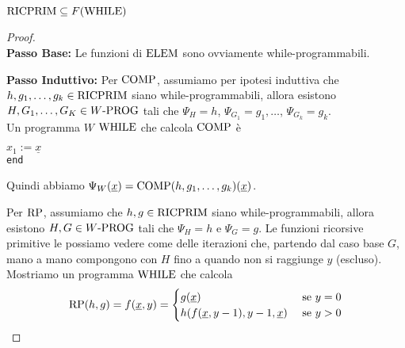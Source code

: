\begin{theor}
	$\text{RICPRIM} \subseteq F(\text{WHILE})$
\end{theor}
\begin{proof} \hspace{1cm} \\
	\textbf{Passo Base:} Le funzioni di $\text{ELEM}$ sono ovviamente while-programmabili.
	
	\textbf{Passo Induttivo:} Per $\text{COMP}$, assumiamo per ipotesi induttiva che $h,g_1, \dots, g_k \in \text{RICPRIM}$ siano while-programmabili, allora esistono $H, G_1, \dots, G_K \in W\text{-PROG}$ tali che $\Psi_H = h$, $\Psi_{G_1} = g_1, \dots$, $\Psi_{G_k} = g_k$.\\
	Un programma $W$ $\text{WHILE}$ che calcola $\text{COMP}$ è
	
	\begin{center}
		\begin{minipage}{0.85\textwidth}
			\begin{tcolorbox}[colback=white,sharp corners,boxrule=.3mm]
				\begin{algorithm}[H]
					\SetAlgoNoEnd
					$x_1 := \underline{x}$ \\
					\texttt{end}
				\end{algorithm}
			\end{tcolorbox}
		\end{minipage}
	\end{center}
	
	Quindi abbiamo $\Psi_W (\underline{x}) = \text{COMP} (h, g_1, \dots, g_k) (\underline{x})$.
	
	Per $\text{RP}$, assumiamo che $h,g \in \text{RICPRIM}$ siano while-programmabili, allora esistono $H,G \in W\text{-PROG}$ tali che $\Psi_H = h$ e $\Psi_G = g$. Le funzioni ricorsive primitive le possiamo vedere come delle iterazioni che, partendo dal caso base $G$, mano a mano compongono con $H$ fino a quando non si raggiunge $y$ (escluso). Mostriamo un programma $\text{WHILE}$ che calcola
	$$ 
	\text{RP} (h,g) = f(\underline{x}, y) = \begin{cases}
		g(\underline{x}) & \text{ se } y = 0 \\
		h(f(\underline{x}, y-1), y-1, \underline{x}) & \text{ se } y > 0
	\end{cases}
	$$
	

\end{proof}

